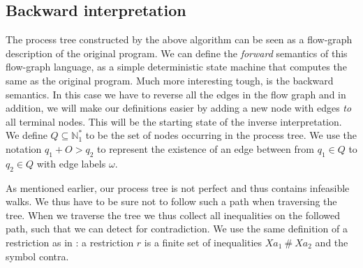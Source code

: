 \documentclass[10pt]{../sigplanconf}
\newcommand{\gen}{\ensuremath{~{\leq\kern-6pt \raisebox{1pt}{$\cdot$}}~}}
\begin{document}


\subsection{Backward interpretation}
The process tree constructed by the above algorithm can be seen as a
flow-graph description of the original program. We can define the
\textit{forward} semantics of this flow-graph language, as a simple
deterministic state machine that computes the same as the original
program. Much more interesting tough, is the backward semantics. In
this case we have to reverse all the edges in the flow graph and in
addition, we will make our definitions easier by adding a new node
with edges \textit{to} all terminal nodes. This will be the starting
state of the inverse interpretation. We define $Q \subseteq
\mathbb{N}^{*}_1$ to be the set of nodes occurring in the process
tree. We use the notation $q_1 +O> q_2$ to represent the existence of
an edge between from $q_1 \in Q$ to $q_2 \in Q$ with edge labels
$\omega$.

As mentioned earlier, our process tree is not perfect and thus
contains infeasible walks. We thus have to be sure not to follow such
a path when traversing the tree. When we traverse the tree we thus
collect all inequalities on the followed path, such that we can detect
for contradiction. We use the same definition of a restriction as in
\cite{abramov2000universal}: a restriction $r$ is a finite set of
inequalities $Xa_1\ \#\ Xa_2$ and the symbol \textsf{contra}.
\end{document}
